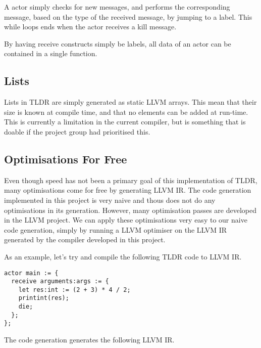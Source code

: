 A actor simply checks for new messages, and performs the corresponding message, based on the type of the received message, by jumping to a label. This while loops ends when the actor receives a kill message.

By having receive constructs simply be labels, all data of an actor can be contained in a single function.

\subsection{Lists}

Lists in TLDR are simply generated as static LLVM arrays. This mean that their size is known at compile time, and that no elements can be added at run-time. This is currently a limitation in the current compiler, but is something that is doable if the project group had prioritised this.

\subsection{Optimisations For Free}

Even though speed has not been a primary goal of this implementation of TLDR, many optimisations come for free by generating LLVM IR. The code generation implemented in this project is very naive and thous does not do any optimisations in its generation. However, many optimisation passes are developed in the LLVM project. We can apply these optimisations very easy to our naive code generation, simply by running a LLVM optimiser on the LLVM IR generated by the compiler developed in this project.

As an example, let's try and compile the following TLDR code to LLVM IR.

\begin{lstlisting}[breaklines]
actor main := {
  receive arguments:args := {
    let res:int := (2 + 3) * 4 / 2;
    printint(res);
    die;
  };
};
\end{lstlisting}

The code generation generates the following LLVM IR.


